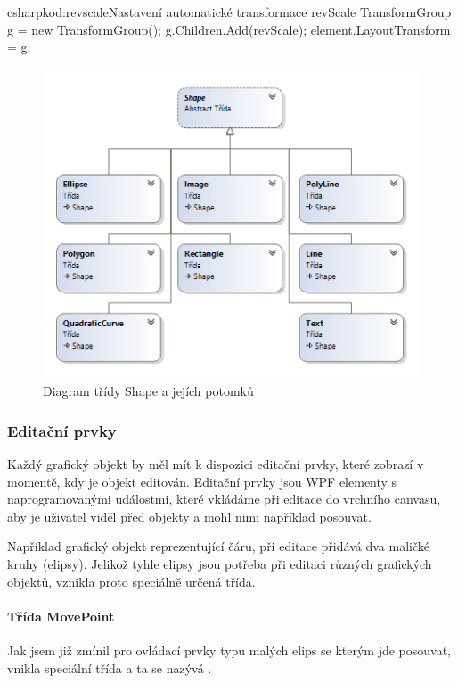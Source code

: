 \documentclass[
  field=inf,
  biblatex,
  glossaries,
  index
]{kidiplom}
\begin{document}
\begin{kicode}{csharp}{kod:revscale}{Nastavení automatické transformace revScale}
TransformGroup g = new TransformGroup();
g.Children.Add(revScale);
element.LayoutTransform = g;
\end{kicode}


\begin{figure}
\includegraphics[width=15cm]{img/shape_diag}
\caption{Diagram třídy Shape a jejích potomků}
\end{figure}  

\subsubsection{Editační prvky}
Každý grafický objekt by měl mít k dispozici editační prvky, které zobrazí v momentě, kdy je objekt editován. Editační prvky jsou WPF elementy s naprogramovanými událostmi, které vkládáme při editace do vrchního canvasu, aby je uživatel viděl před objekty a mohl nimi například posouvat.

Například grafický objekt reprezentující čáru, při editace přidává dva maličké kruhy (elipsy). Jelikož tyhle elipsy jsou potřeba při editaci různých grafických objektů, vznikla proto speciálně určená třída.

\paragraph{Třída MovePoint}
Jak jsem již zmínil pro ovládací prvky typu malých elips se kterým jde posouvat, vnikla speciální třída a ta se nazývá .
\end{document}
